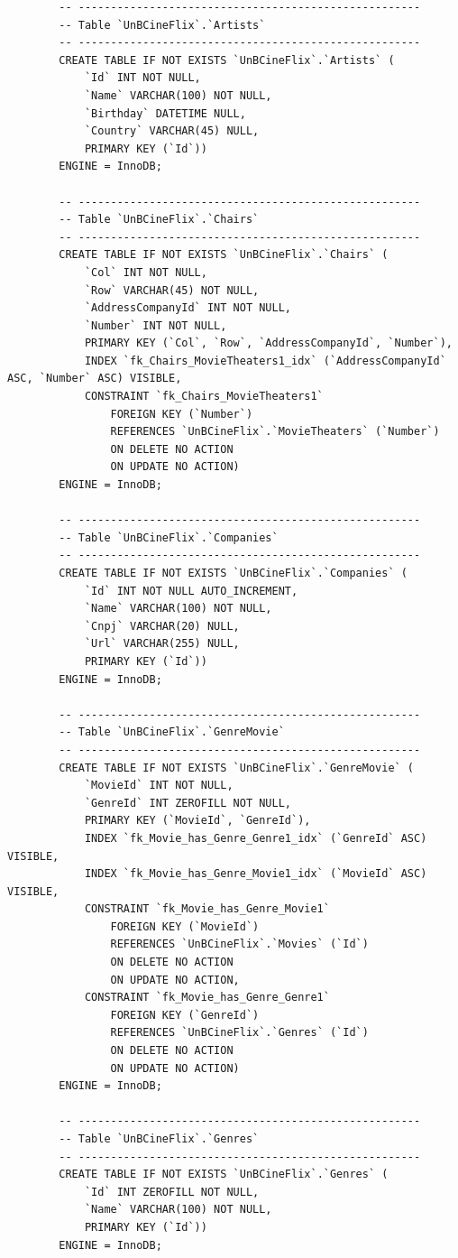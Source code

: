 \documentclass[a4paper,10pt]{article}
\begin{document}
\begin{lstlisting}
		-- -----------------------------------------------------
		-- Table `UnBCineFlix`.`Artists`
		-- -----------------------------------------------------
		CREATE TABLE IF NOT EXISTS `UnBCineFlix`.`Artists` (
			`Id` INT NOT NULL,
			`Name` VARCHAR(100) NOT NULL,
			`Birthday` DATETIME NULL,
			`Country` VARCHAR(45) NULL,
			PRIMARY KEY (`Id`))
		ENGINE = InnoDB;

		-- -----------------------------------------------------
		-- Table `UnBCineFlix`.`Chairs`
		-- -----------------------------------------------------
		CREATE TABLE IF NOT EXISTS `UnBCineFlix`.`Chairs` (
			`Col` INT NOT NULL,
			`Row` VARCHAR(45) NOT NULL,
			`AddressCompanyId` INT NOT NULL,
			`Number` INT NOT NULL,
			PRIMARY KEY (`Col`, `Row`, `AddressCompanyId`, `Number`),
			INDEX `fk_Chairs_MovieTheaters1_idx` (`AddressCompanyId` ASC, `Number` ASC) VISIBLE,
			CONSTRAINT `fk_Chairs_MovieTheaters1`
				FOREIGN KEY (`Number`)
				REFERENCES `UnBCineFlix`.`MovieTheaters` (`Number`)
				ON DELETE NO ACTION
				ON UPDATE NO ACTION)
		ENGINE = InnoDB;

		-- -----------------------------------------------------
		-- Table `UnBCineFlix`.`Companies`
		-- -----------------------------------------------------
		CREATE TABLE IF NOT EXISTS `UnBCineFlix`.`Companies` (
			`Id` INT NOT NULL AUTO_INCREMENT,
			`Name` VARCHAR(100) NOT NULL,
			`Cnpj` VARCHAR(20) NULL,
			`Url` VARCHAR(255) NULL,
			PRIMARY KEY (`Id`))
		ENGINE = InnoDB;

		-- -----------------------------------------------------
		-- Table `UnBCineFlix`.`GenreMovie`
		-- -----------------------------------------------------
		CREATE TABLE IF NOT EXISTS `UnBCineFlix`.`GenreMovie` (
			`MovieId` INT NOT NULL,
			`GenreId` INT ZEROFILL NOT NULL,
			PRIMARY KEY (`MovieId`, `GenreId`),
			INDEX `fk_Movie_has_Genre_Genre1_idx` (`GenreId` ASC) VISIBLE,
			INDEX `fk_Movie_has_Genre_Movie1_idx` (`MovieId` ASC) VISIBLE,
			CONSTRAINT `fk_Movie_has_Genre_Movie1`
				FOREIGN KEY (`MovieId`)
				REFERENCES `UnBCineFlix`.`Movies` (`Id`)
				ON DELETE NO ACTION
				ON UPDATE NO ACTION,
			CONSTRAINT `fk_Movie_has_Genre_Genre1`
				FOREIGN KEY (`GenreId`)
				REFERENCES `UnBCineFlix`.`Genres` (`Id`)
				ON DELETE NO ACTION
				ON UPDATE NO ACTION)
		ENGINE = InnoDB;

		-- -----------------------------------------------------
		-- Table `UnBCineFlix`.`Genres`
		-- -----------------------------------------------------
		CREATE TABLE IF NOT EXISTS `UnBCineFlix`.`Genres` (
			`Id` INT ZEROFILL NOT NULL,
			`Name` VARCHAR(100) NOT NULL,
			PRIMARY KEY (`Id`))
		ENGINE = InnoDB;


\end{lstlisting}
\end{document}

